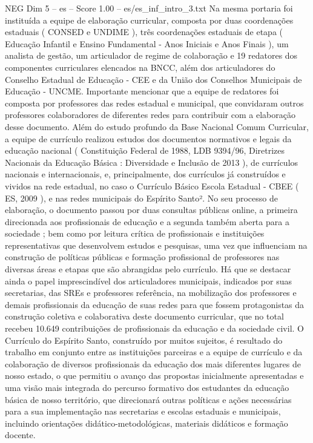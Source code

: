 \begin{textsample}{NEG Dim 5 – es – Score 1.00 – es/es\_inf\_intro\_3.txt}
Na mesma portaria foi instituída a equipe de elaboração curricular, composta por duas coordenações estaduais ( CONSED e UNDIME ), três coordenações estaduais de etapa ( Educação Infantil e Ensino Fundamental - Anos Iniciais e Anos Finais ), um analista de gestão, um articulador de regime de colaboração e 19 redatores dos componentes curriculares elencados na BNCC, além dos articuladores do Conselho Estadual de Educação - CEE e da União dos Conselhos Municipais de Educação - UNCME.
Importante mencionar que a equipe de redatores foi composta por professores das redes estadual e municipal, que convidaram outros professores colaboradores de diferentes redes para contribuir com a elaboração desse documento.
Além do estudo profundo da Base Nacional Comum Curricular, a equipe de currículo realizou estudos dos documentos normativos e legais da educação nacional ( Constituição Federal de 1988, LDB 9394/96, Diretrizes Nacionais da Educação Básica : Diversidade e Inclusão de 2013 ), de currículos nacionais e internacionais, e, principalmente, dos currículos já construídos e vividos na rede estadual, no caso o Currículo Básico Escola Estadual - CBEE ( ES, 2009 ), e nas redes municipais do Espírito Santo².
No seu processo de elaboração, o documento passou por duas consultas públicas online, a primeira direcionada aos profissionais de educação e a segunda também aberta para a sociedade ; bem como por leitura crítica de profissionais e instituições representativas que desenvolvem estudos e pesquisas, uma vez que influenciam na construção de políticas públicas e formação profissional de professores nas diversas áreas e etapas que são abrangidas pelo currículo.
Há que se destacar ainda o papel imprescindível dos articuladores municipais, indicados por suas secretarias, das SREs e professores referência, na mobilização dos professores e demais profissionais da educação de suas redes para que fossem protagonistas da construção coletiva e colaborativa deste documento curricular, que no total recebeu 10.649 contribuições de profissionais da educação e da sociedade civil.
O Currículo do Espírito Santo, construído por muitos sujeitos, é resultado do trabalho em conjunto entre as instituições parceiras e a equipe de currículo e da colaboração de diversos profissionais da educação dos mais diferentes lugares de nosso estado, o que permitiu o avanço das propostas inicialmente apresentadas e uma visão mais integrada do percurso formativo dos estudantes da educação básica de nosso território, que direcionará outras políticas e ações necessárias para a sua implementação nas secretarias e escolas estaduais e municipais, incluindo orientações didático-metodológicas, materiais didáticos e formação docente.

\end{textsample}
